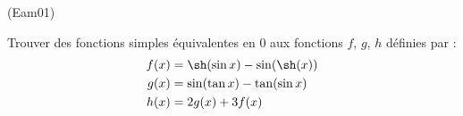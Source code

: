 \begin{tiny}(Eam01)\end{tiny}
Trouver des fonctions simples équivalentes en $0$ aux fonctions $f$, $g$, $h$ définies par :
\begin{align*}
 f(x) &=\sh(\sin x) - \sin(\sh(x))\\
 g(x) &= \sin(\tan x) - \tan(\sin x) \\
 h(x) &= 2g(x) + 3f(x)
\end{align*}
